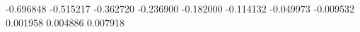 -0.696848
-0.515217
-0.362720
-0.236900
-0.182000
-0.114132
-0.049973
-0.009532
0.001958
0.004886
0.007918
